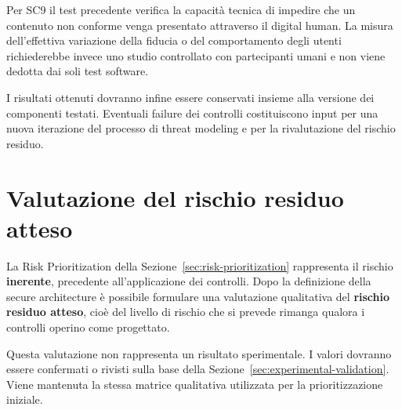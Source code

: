 \documentclass[11pt,a4paper]{article}
\begin{document}
Per SC9 il test precedente verifica la capacità tecnica di impedire che
un contenuto non conforme venga presentato attraverso il digital human.
La misura dell'effettiva variazione della fiducia o del comportamento
degli utenti richiederebbe invece uno studio controllato con
partecipanti umani e non viene dedotta dai soli test software.

I risultati ottenuti dovranno infine essere conservati insieme alla
versione dei componenti testati. Eventuali failure dei controlli
costituiscono input per una nuova iterazione del processo di threat
modeling e per la rivalutazione del rischio residuo.


\section{Valutazione del rischio residuo atteso}
\label{sec:residual-risk}

La Risk Prioritization della
Sezione~\ref{sec:risk-prioritization} rappresenta il rischio
\textbf{inerente}, precedente all'applicazione dei controlli. Dopo la
definizione della secure architecture è possibile formulare una
valutazione qualitativa del \textbf{rischio residuo atteso}, cioè del
livello di rischio che si prevede rimanga qualora i controlli operino
come progettato.

Questa valutazione non rappresenta un risultato sperimentale. I valori
dovranno essere confermati o rivisti sulla base della
Sezione~\ref{sec:experimental-validation}. Viene mantenuta la stessa
matrice qualitativa utilizzata per la prioritizzazione iniziale.

\begingroup
\setlength{\tabcolsep}{4pt}
\footnotesize
\end{document}
